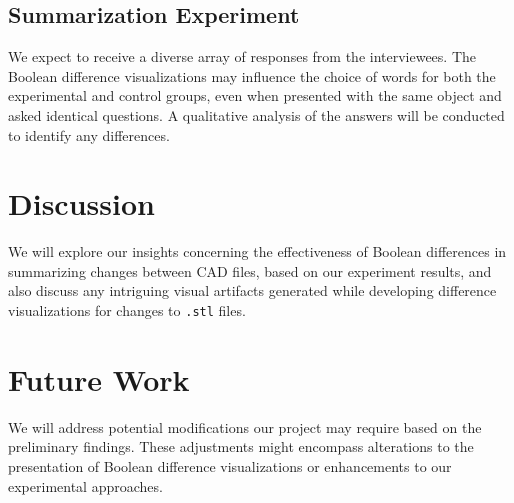 \documentclass[sigconf,authorversion,nonacm]{acmart}
\begin{document}
\subsection{Summarization Experiment}
We expect to receive a diverse array of responses from the interviewees. The Boolean difference visualizations may influence the choice of words for both the experimental and control groups, even when presented with the same object and asked identical questions. A qualitative analysis of the answers will be conducted to identify any differences.

\section{Discussion}

We will explore our insights concerning the effectiveness of Boolean differences in summarizing changes between CAD files, based on our experiment results, and also discuss any intriguing visual artifacts generated while developing difference visualizations for changes to \texttt{.stl} files.

\section{Future Work}
We will address potential modifications our project may require based on the preliminary findings. These adjustments might encompass alterations to the presentation of Boolean difference visualizations or enhancements to our experimental approaches.



\appendix
\end{document}
